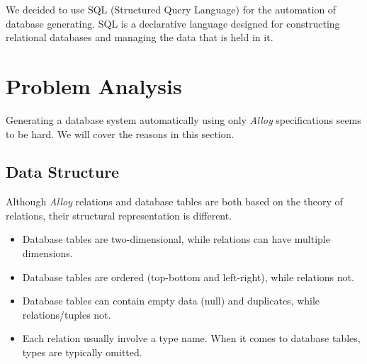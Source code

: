 \documentclass[oneside]{book}
\begin{document}
We decided to use SQL (Structured Query Language) for the automation of database generating. SQL is a declarative language designed for constructing relational databases and managing the data that is held in it.\\

\section{Problem Analysis}

Generating a database system automatically using only \textit{Alloy} specifications seems to be hard. We will cover the reasons in this section.

\subsection{Data Structure}

Although \textit{Alloy} relations and database tables are both based on the theory of relations, their structural representation is different.\\

\begin{itemize}
	\item Database tables are two-dimensional, while relations can have multiple dimensions.
	\item Database tables are ordered (top-bottom and left-right), while relations not.
	\item Database tables can contain empty data (null) and duplicates, while relations/tuples not.
	\item Each relation usually involve a type name. When it comes to database tables, types are typically omitted.
\end{itemize}
\end{document}
